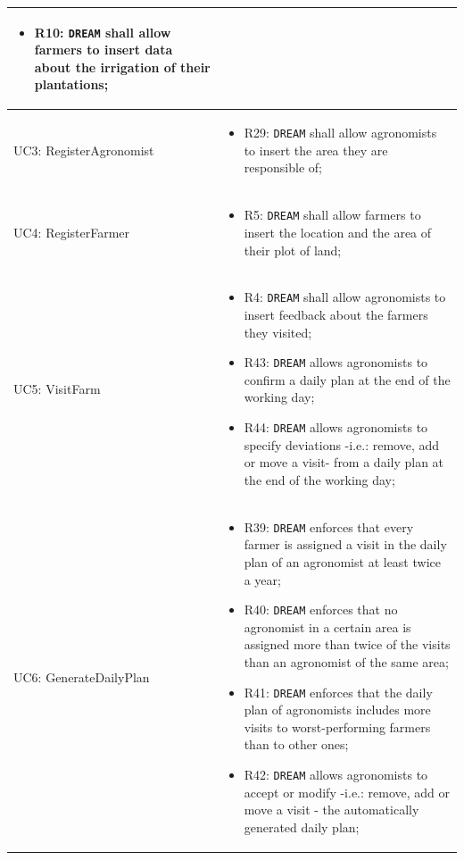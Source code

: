 \documentclass{article}
\begin{document}
\begin{longtable}[c]{|m{}|m{8cm}|}
\begin{itemize}
        \item R10: \verb|DREAM| shall allow farmers to insert data about the irrigation of their plantations;
    \end{itemize}\\
\hline
 UC3: RegisterAgronomist &
\begin{itemize}
    \item R29: \verb|DREAM| shall allow agronomists to insert the area they are responsible of;
\end{itemize}\\
\hline
 UC4: RegisterFarmer &
\begin{itemize}
    \item R5: \verb|DREAM| shall allow farmers to insert the location and the area of their plot of land;
\end{itemize}\\
\hline
UC5: VisitFarm &
\begin{itemize}
    \item R4: \verb|DREAM| shall allow agronomists to insert feedback about the farmers they visited;
    
    \item R43: \verb|DREAM| allows agronomists to confirm a daily plan at the end of the working day; 

    \item R44: \verb|DREAM| allows agronomists to specify deviations -i.e.: remove, add or move a visit- from a daily plan at the end of the working day; 
\end{itemize}\\
\hline
UC6: GenerateDailyPlan &
\begin{itemize}
    \item R39: \verb|DREAM| enforces that every farmer is assigned a visit in the daily plan of an agronomist at least twice a year;

    \item R40: \verb|DREAM| enforces that no agronomist in a certain area is assigned more than twice of the visits than an agronomist of the same area;

    \item R41: \verb|DREAM| enforces that the daily plan of agronomists includes more visits to worst-performing farmers than to other ones;

    \item R42: \verb|DREAM| allows agronomists to accept or modify -i.e.: remove, add or move a visit - the automatically generated daily plan;


\end{itemize}
\end{longtable}
\end{document}
